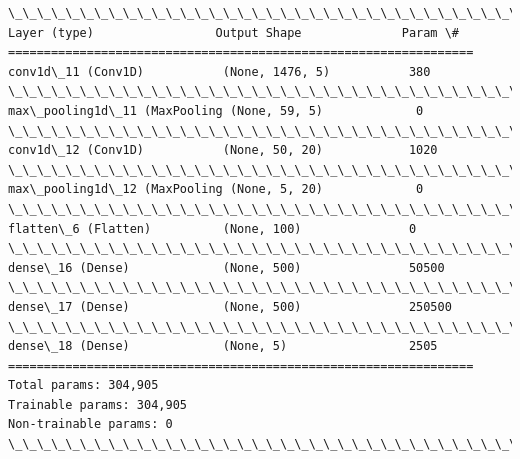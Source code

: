 \documentclass[11pt]{article}
\begin{document}
    \begin{Verbatim}[commandchars=\\\{\}]
\_\_\_\_\_\_\_\_\_\_\_\_\_\_\_\_\_\_\_\_\_\_\_\_\_\_\_\_\_\_\_\_\_\_\_\_\_\_\_\_\_\_\_\_\_\_\_\_\_\_\_\_\_\_\_\_\_\_\_\_\_\_\_\_\_
Layer (type)                 Output Shape              Param \#   
=================================================================
conv1d\_11 (Conv1D)           (None, 1476, 5)           380       
\_\_\_\_\_\_\_\_\_\_\_\_\_\_\_\_\_\_\_\_\_\_\_\_\_\_\_\_\_\_\_\_\_\_\_\_\_\_\_\_\_\_\_\_\_\_\_\_\_\_\_\_\_\_\_\_\_\_\_\_\_\_\_\_\_
max\_pooling1d\_11 (MaxPooling (None, 59, 5)             0         
\_\_\_\_\_\_\_\_\_\_\_\_\_\_\_\_\_\_\_\_\_\_\_\_\_\_\_\_\_\_\_\_\_\_\_\_\_\_\_\_\_\_\_\_\_\_\_\_\_\_\_\_\_\_\_\_\_\_\_\_\_\_\_\_\_
conv1d\_12 (Conv1D)           (None, 50, 20)            1020      
\_\_\_\_\_\_\_\_\_\_\_\_\_\_\_\_\_\_\_\_\_\_\_\_\_\_\_\_\_\_\_\_\_\_\_\_\_\_\_\_\_\_\_\_\_\_\_\_\_\_\_\_\_\_\_\_\_\_\_\_\_\_\_\_\_
max\_pooling1d\_12 (MaxPooling (None, 5, 20)             0         
\_\_\_\_\_\_\_\_\_\_\_\_\_\_\_\_\_\_\_\_\_\_\_\_\_\_\_\_\_\_\_\_\_\_\_\_\_\_\_\_\_\_\_\_\_\_\_\_\_\_\_\_\_\_\_\_\_\_\_\_\_\_\_\_\_
flatten\_6 (Flatten)          (None, 100)               0         
\_\_\_\_\_\_\_\_\_\_\_\_\_\_\_\_\_\_\_\_\_\_\_\_\_\_\_\_\_\_\_\_\_\_\_\_\_\_\_\_\_\_\_\_\_\_\_\_\_\_\_\_\_\_\_\_\_\_\_\_\_\_\_\_\_
dense\_16 (Dense)             (None, 500)               50500     
\_\_\_\_\_\_\_\_\_\_\_\_\_\_\_\_\_\_\_\_\_\_\_\_\_\_\_\_\_\_\_\_\_\_\_\_\_\_\_\_\_\_\_\_\_\_\_\_\_\_\_\_\_\_\_\_\_\_\_\_\_\_\_\_\_
dense\_17 (Dense)             (None, 500)               250500    
\_\_\_\_\_\_\_\_\_\_\_\_\_\_\_\_\_\_\_\_\_\_\_\_\_\_\_\_\_\_\_\_\_\_\_\_\_\_\_\_\_\_\_\_\_\_\_\_\_\_\_\_\_\_\_\_\_\_\_\_\_\_\_\_\_
dense\_18 (Dense)             (None, 5)                 2505      
=================================================================
Total params: 304,905
Trainable params: 304,905
Non-trainable params: 0
\_\_\_\_\_\_\_\_\_\_\_\_\_\_\_\_\_\_\_\_\_\_\_\_\_\_\_\_\_\_\_\_\_\_\_\_\_\_\_\_\_\_\_\_\_\_\_\_\_\_\_\_\_\_\_\_\_\_\_\_\_\_\_\_\_

    \end{Verbatim}

    \begin{center}
    \end{center}
    { \hspace*{\fill} \\}
    
    \begin{center}
    \end{center}
    { \hspace*{\fill} \\}
    
\end{document}
